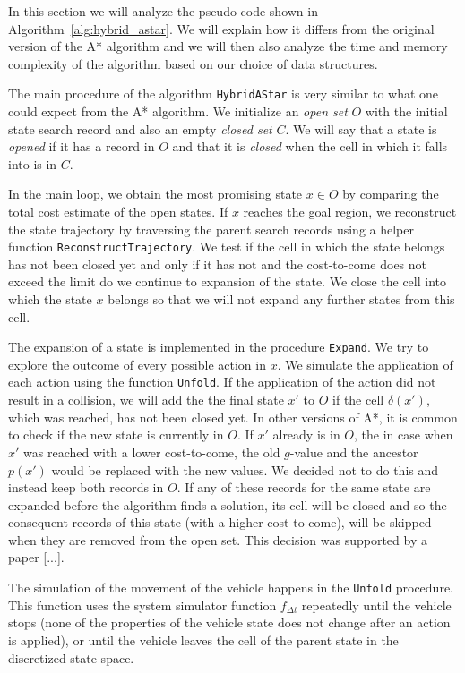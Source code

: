 In this section we will analyze the pseudo-code shown in Algorithm~\ref{alg:hybrid_astar}. We will explain how it differs from the original version of the A* algorithm \cite{Nilsson_astar} and we will then also analyze the time and memory complexity of the algorithm based on our choice of data structures.

The main procedure of the algorithm \texttt{HybridAStar} is very similar to what one could expect from the A* algorithm. We initialize an \textit{open set} $O$ with the initial state search record and also an empty \textit{closed set} $C$. We will say that a state is \textit{opened} if it has a record in $O$ and that it is \textit{closed} when the cell in which it falls into is in $C$.

In the main loop, we obtain the most promising state $x\in O$ by comparing the total cost estimate of the open states. If $x$ reaches the goal region, we reconstruct the state trajectory by traversing the parent search records using a helper function \texttt{ReconstructTrajectory}. We test if the cell in which the state belongs has not been closed yet and only if it has not and the cost-to-come does not exceed the limit do we continue to expansion of the state. We close the cell into which the state $x$ belongs so that we will not expand any further states from this cell.

The expansion of a state is implemented in the procedure \texttt{Expand}. We try to explore the outcome of every possible action in $x$. We simulate the application of each action using the function \texttt{Unfold}. If the application of the action did not result in a collision, we will add the the final state $x'$ to $O$ if the cell $\delta(x')$, which was reached, has not been closed yet. In other versions of A*, it is common to check if the new state is currently in $O$. If $x'$ already is in $O$, the in case when $x'$ was reached with a lower cost-to-come, the old $g$-value and the ancestor $p(x')$ would be replaced with the new values. We decided not to do this and instead keep both records in $O$. If any of these records for the same state are expanded before the algorithm finds a solution, its cell will be closed and so the consequent records of this state (with a higher cost-to-come), will be skipped when they are removed from the open set. This decision was supported by a paper [...].

The simulation of the movement of the vehicle happens in the \texttt{Unfold} procedure. This function uses the system simulator function $f_{\Delta t}$ repeatedly until the vehicle stops (none of the properties of the vehicle state does not change after an action is applied), or until the vehicle leaves the cell of the parent state in the discretized state space.

